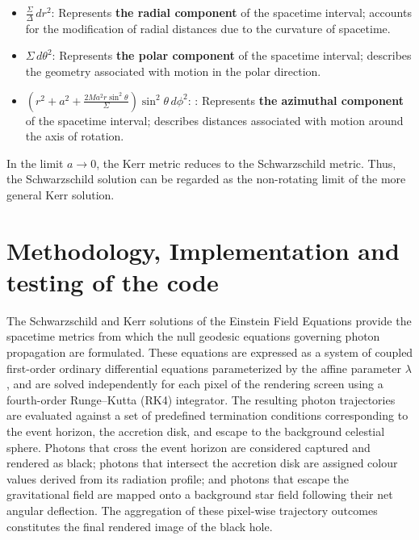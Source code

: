 \documentclass[12pt]{article}
\begin{document}
\begin{itemize}
\begin{itemize}
\item[$\bullet$] $\displaystyle \frac{\Sigma}{\Delta}\,dr^2$: Represents \textbf{the radial component} of the spacetime interval; accounts for the modification of radial distances due to the curvature of spacetime.

\item[$\bullet$] $\displaystyle \Sigma\,d\theta^2$: Represents \textbf{the polar component} of the spacetime interval; describes the geometry associated with motion in the polar direction.

\item[$\bullet$] $\displaystyle\left(r^2+a^2+\frac{2Ma^2r\sin^2\theta}{\Sigma}\right)\sin^2\theta\,d\phi^2$:
: Represents \textbf{the azimuthal component} of the spacetime interval; describes distances associated with motion around the axis of rotation.

\end{itemize}

In the limit $a\rightarrow0$, the Kerr metric reduces to the Schwarzschild metric. Thus, the Schwarzschild solution can be regarded as the non-rotating limit of the more general Kerr solution.

\section{\textbf{Methodology, Implementation and \\testing of the code}}
The Schwarzschild and Kerr solutions of the Einstein Field Equations provide the spacetime metrics from which the null geodesic equations governing photon propagation are formulated. These equations are expressed as a system of coupled first-order ordinary differential equations parameterized by the affine parameter $\lambda$, and are solved independently for each pixel of the rendering screen using a fourth-order Runge–Kutta (RK4) integrator. The resulting photon trajectories are evaluated against a set of predefined termination conditions corresponding to the event horizon, the accretion disk, and escape to the background celestial sphere. Photons that cross the event horizon are considered captured and rendered as black; photons that intersect the accretion disk are assigned colour values derived from its radiation profile; and photons that escape the gravitational field are mapped onto a background star field following their net angular deflection. The aggregation of these pixel-wise trajectory outcomes constitutes the final rendered image of the black hole.


\end{itemize}
\end{document}
